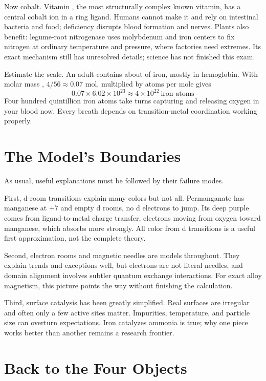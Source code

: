 Now cobalt. Vitamin , the most structurally complex known vitamin, has a central cobalt ion in a ring ligand. Humans cannot make it and rely on intestinal bacteria and food; deficiency disrupts blood formation and nerves. Plants also benefit: legume-root nitrogenase uses molybdenum and iron centers to fix nitrogen at ordinary temperature and pressure, where factories need extremes. Its exact mechanism still has unresolved details; science has not finished this exam.

Estimate the scale. An adult contains about  of iron, mostly in hemoglobin. With molar mass , $4/56 \approx 0.07$ mol, multiplied by  atoms per mole gives
\[0.07 \times 6.02\times 10^{23} \approx 4\times 10^{22}\ \text{iron atoms}\]
Four hundred quintillion iron atoms take turns capturing and releasing oxygen in your blood now. Every breath depends on transition-metal coordination working properly.

\section{The Model's Boundaries}

As usual, useful explanations must be followed by their failure modes.

First, d-room transitions explain many colors but not all. Permanganate  has manganese at $+7$ and empty d rooms, no d electrons to jump. Its deep purple comes from ligand-to-metal charge transfer, electrons moving from oxygen toward manganese, which absorbs more strongly. All color from d transitions is a useful first approximation, not the complete theory.

Second, electron rooms and magnetic needles are models throughout. They explain trends and exceptions well, but electrons are not literal needles, and domain alignment involves subtler quantum exchange interactions. For exact alloy magnetism, this picture points the way without finishing the calculation.

Third, surface catalysis has been greatly simplified. Real surfaces are irregular and often only a few active sites matter. Impurities, temperature, and particle size can overturn expectations. Iron catalyzes ammonia is true; why one piece works better than another remains a research frontier.

\section{Back to the Four Objects}


